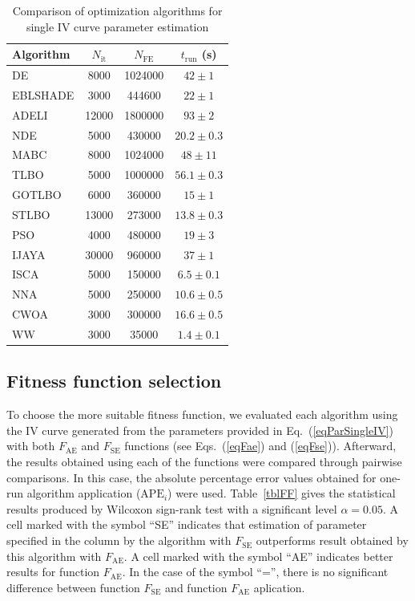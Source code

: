 \documentclass[a4paper,fleqn]{cas-dc}
\begin{document}
\begin{table}[<options>]
\caption{Comparison of optimization algorithms for single IV curve parameter estimation}\label{tblRun}
\begin{tabular*}{\tblwidth}{@{}LCCC@{}}
\toprule
Algorithm  &  $N_\mathrm{it}$ & $N_\mathrm{FE}$ & $t_\mathrm{run}$ (s)\\ %
\midrule
DE & 8000& 1024000& $42\pm1$\\
EBLSHADE & 3000& 444600& $22\pm1$\\
ADELI & 12000& 1800000& $93\pm2$\\
NDE & 5000& 430000&$20.2\pm0.3$ \\
MABC & 8000& 1024000&$48\pm11$ \\
TLBO & 5000& 1000000&$56.1\pm0.3$ \\
GOTLBO & 6000& 360000&$15\pm1$ \\
STLBO & 13000& 273000&$13.8\pm0.3$ \\
PSO & 4000& 480000&$19\pm3$ \\
IJAYA & 30000& 960000&$37\pm1$ \\
ISCA & 5000& 150000&$6.5\pm0.1$ \\
NNA & 5000& 250000&$10.6\pm0.5$ \\
CWOA & 3000& 300000&$16.6\pm0.5$ \\
WW & 3000& 35000&$1.4\pm0.1$ \\
\bottomrule
\end{tabular*}
\end{table}



\subsection{Fitness function selection}

To choose the more suitable fitness function, we evaluated each algorithm using the IV curve generated from the parameters
provided in Eq.~(\ref{eqParSingleIV}) with both $F_\mathrm{AE}$ and $F_\mathrm{SE}$ functions (see Eqs.~(\ref{eqFae}) and (\ref{eqFse})).
Afterward, the results obtained using each of the functions were compared through pairwise comparisons.
In this case, the absolute percentage error values obtained for one-run algorithm application ($\mathrm{APE}_i$) were used.
Table~\ref{tblFF} gives the statistical results produced by Wilcoxon sign-rank test with a significant level $\alpha = 0.05$.
A cell marked with the symbol ``SE'' indicates that estimation of parameter specified in the column by the algorithm with $F_\mathrm{SE}$ outperforms result obtained by this  algorithm with $F_\mathrm{AE}$.
A cell marked with the symbol ``AE'' indicates better results for function $F_\mathrm{AE}$.
In the case of the symbol ``='', there is no significant difference between function $F_\mathrm{SE}$ and function $F_\mathrm{AE}$ aplication.
\end{document}
